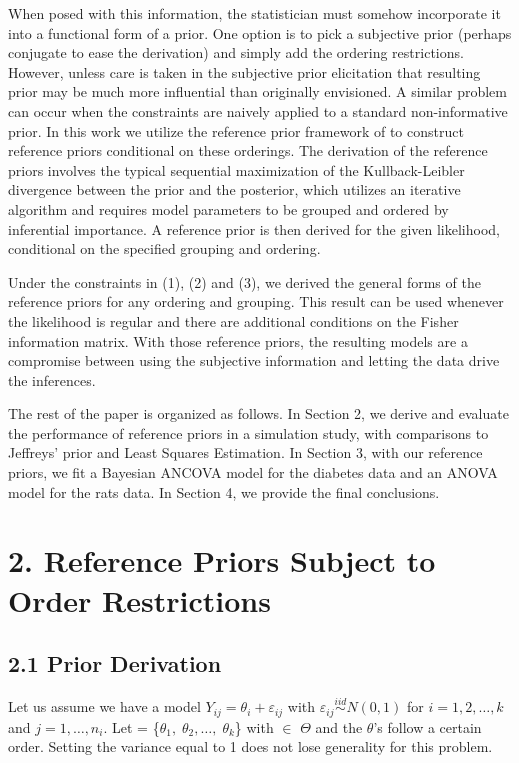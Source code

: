\documentclass[Proceedings]{ascelike}
\begin{document}
When posed with this information, the statistician must somehow incorporate it into a functional form of a prior. One option is to pick a subjective prior (perhaps conjugate to ease the derivation) and simply add the ordering restrictions. However, unless care is taken in the subjective prior elicitation that resulting prior may be much more influential than originally envisioned. A similar problem can occur when the constraints are naively applied to a standard non-informative prior. In this work we utilize the reference prior framework of \cite{BergerBernardo1992} to construct reference priors conditional on these orderings. The derivation of the reference priors involves the typical sequential maximization of the Kullback-Leibler divergence between the prior and the posterior, which utilizes an iterative algorithm and requires model parameters to be grouped and ordered by inferential importance. A reference prior is then derived for the given likelihood, conditional on the specified grouping and ordering.

Under the constraints in (1), (2) and (3), we derived the general forms of the reference priors for any ordering and grouping. This result can be used whenever the likelihood is regular and there are additional conditions on the Fisher information matrix. With those reference priors, the resulting models are a compromise between using the subjective information and letting the data drive the inferences.

The rest of the paper is organized as follows. In Section 2, we derive and evaluate the performance of reference priors in a simulation study, with comparisons to Jeffreys' prior and Least Squares Estimation. In Section 3, with our reference priors, we fit a Bayesian ANCOVA model for the diabetes data and an ANOVA model for the rats data. In Section 4, we provide the final conclusions.

\section{2. Reference Priors Subject to Order Restrictions}
\subsection{2.1 Prior Derivation}
Let us assume we have a model $Y_{ij}=\theta_i + \varepsilon_{ij}$ with $\varepsilon_{ij}\overset{iid}{\sim}N(0,1)$ for $i = 1, 2, \hdots, k$ and $j = 1, \hdots, n_i.$ Let \pmb{$\theta$} = \{$\theta_1,\;\theta_2,\hdots,\;\theta_k$\} with \pmb{$\theta$} $\in$ $\Theta$ and the $\theta$'s follow a certain order. Setting the variance equal to 1 does not lose generality for this problem. 
\end{document}
